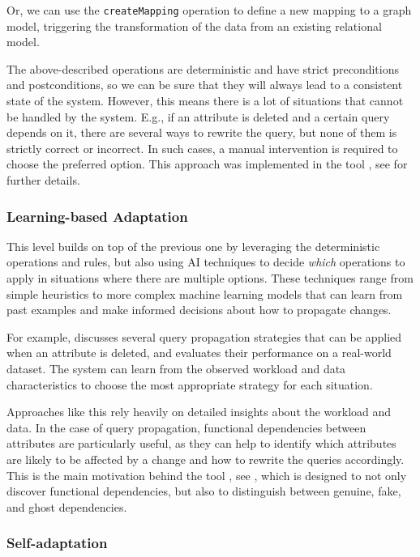 Or, we can use the \texttt{createMapping} operation to define a new mapping to a graph model, triggering the transformation of the data from an existing relational model.

The above-described operations are deterministic and have strict preconditions and postconditions, so we can be sure that they will always lead to a consistent state of the system. However, this means there is a lot of situations that cannot be handled by the system. E.g., if an attribute is deleted and a certain query depends on it, there are several ways to rewrite the query, but none of them is strictly correct or incorrect. In such cases, a manual intervention is required to choose the preferred option. This approach was implemented in the tool , see  for further details.

\subsubsection{Learning-based Adaptation}

This level builds on top of the previous one by leveraging the deterministic operations and rules, but also using AI techniques to decide \emph{which} operations to apply in situations where there are multiple options. These techniques range from simple heuristics to more complex machine learning models that can learn from past examples and make informed decisions about how to propagate changes.

For example,  discusses several query propagation strategies that can be applied when an attribute is deleted, and evaluates their performance on a real-world dataset. The system can learn from the observed workload and data characteristics to choose the most appropriate strategy for each situation.

Approaches like this rely heavily on detailed insights about the workload and data. In the case of query propagation, functional dependencies between attributes are particularly useful, as they can help to identify which attributes are likely to be affected by a change and how to rewrite the queries accordingly. This is the main motivation behind the tool , see , which is designed to not only discover functional dependencies, but also to distinguish between genuine, fake, and ghost dependencies.

\subsubsection{Self-adaptation}

